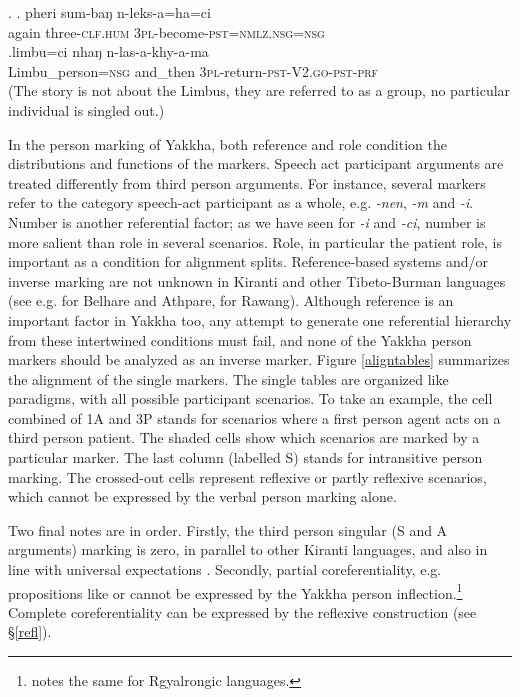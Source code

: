 \ex. \ag.           pheri sum-baŋ       n-leks-a=ha=ci\\
again three{\scshape -clf.hum} {\scshape 3pl-}become{\scshape -pst=nmlz.nsg=nsg}\\
 
\bg.limbu=ci nhaŋ n-las-a-khy-a-ma\\
Limbu\_person{\scshape =nsg} and\_then {\scshape 3pl-}return{\scshape -pst-V2.go-pst-prf}\\
 (The story is not about the Limbus, they are referred to as  a group, no particular individual is singled out.) 


In the person marking of Yakkha, both reference and role condition the distributions and functions of the markers. Speech act participant arguments are treated differently from third person arguments. For instance, several markers refer to the category speech-act participant as a whole, e.g. \emph{-nen}, \emph{-m} and \emph{-i}. Number is another referential factor; as we have seen for \emph{-i} and \emph{-ci}, number is more salient than role in several scenarios. Role, in particular the patient role, is important as a condition for alignment splits. 
Reference-based systems and/or inverse marking are not unknown in Kiranti and other Tibeto-Burman languages  (see e.g. \citet{Ebert1991Inverse} for Belhare and Athpare, \citet{LaPolla2007Hierarchical} for Rawang). Although reference is an important factor in Yakkha too, any attempt to generate one referential hierarchy from these intertwined conditions must  fail, and none of the Yakkha person markers should be analyzed as an inverse marker. Figure \ref{aligntables} summarizes  the alignment of the single markers. The single tables are organized like paradigms, with all possible participant scenarios. To take an example, the cell combined of 1A and 3P stands for scenarios where a first person agent acts on a third person patient. The shaded cells show which  scenarios are marked by a particular marker. The last column (labelled S) stands for intransitive person marking. The crossed-out cells represent reflexive or partly reflexive scenarios, which cannot be expressed by the verbal person marking alone.

Two final notes are in order. Firstly, the third person singular (S and A arguments) marking is zero, in parallel to other Kiranti languages, and also in line with universal expectations \citep{Siewierska2008_Person}. Secondly, partial coreferentiality, e.g. propositions like  or  cannot be expressed by the Yakkha person inflection.\footnote{\citet{Jacques2012_Agreement} notes the same for Rgyalrongic languages.}  Complete coreferentiality can be expressed by the  reflexive construction (see  §\ref{refl}).


